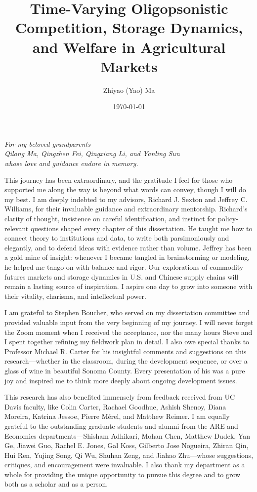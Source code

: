 \documentclass[12pt,authoryear, notitlepage]{elegantpaper}
\title{Time-Varying Oligopsonistic Competition, Storage Dynamics, and Welfare in Agricultural Markets}
\author{Zhiyao (Yao) Ma}
\institute{Committee: Richard J. Sexton, Jeffrey C. Williams, and Stephen Boucher}
\date{\today}
\begin{document}
\maketitle
\thispagestyle{empty}


\begin{dedication}
\textit{For my beloved grandparents}\\
\textit{Qilong Ma, Qingzhen Fei, Qingxiang Li, and Yanling Sun}\\
\textit{whose love and guidance endure in memory.}
\end{dedication}


\newpage
{}


\begin{acknowledgments}
This journey has been extraordinary, and the gratitude I feel for those who supported me along the way is beyond what words can convey, though I will do my best. I am deeply indebted to my advisors, Richard J. Sexton and Jeffrey C. Williams, for their invaluable guidance and extraordinary mentorship. Richard's clarity of thought, insistence on careful identification, and instinct for policy-relevant questions shaped every chapter of this dissertation. He taught me how to connect theory to institutions and data, to write both parsimoniously and elegantly, and to defend ideas with evidence rather than volume. Jeffrey has been a gold mine of insight: whenever I became tangled in brainstorming or modeling, he helped me tango on with balance and rigor. Our explorations of commodity futures markets and storage dynamics in U.S. and Chinese supply chains will remain a lasting source of inspiration. I aspire one day to grow into someone with their vitality, charisma, and intellectual power.

I am grateful to Stephen Boucher, who served on my dissertation committee and provided valuable input from the very beginning of my journey. I will never forget the Zoom moment when I received the acceptance, nor the many hours Steve and I spent together refining my fieldwork plan in detail. I also owe special thanks to Professor Michael R. Carter for his insightful comments and suggestions on this research---whether in the classroom, during the development sequence, or over a glass of wine in beautiful Sonoma County. Every presentation of his was a pure joy and inspired me to think more deeply about ongoing development issues.

This research has also benefited immensely from feedback received from UC Davis faculty, like Colin Carter, Rachael Goodhue, Ashish Shenoy, Diana Moreira, Katrina Jessoe, Pierre M\'erel, and Matthew Reimer. I am equally grateful to the outstanding graduate students and alumni from the ARE and Economics departments---Shisham Adhikari, Mohan Chen, Matthew Dudek, Yan Ge, Jiawei Guo, Rachel E. Jones, Gal Koss, Gilberto Jose Nogueira, Zhiran Qin, Hui Ren, Yujing Song, Qi Wu, Shuhan Zeng, and Jiahao Zhu---whose suggestions, critiques, and encouragement were invaluable. I also thank my department as a whole for providing the unique opportunity to pursue this degree and to grow both as a scholar and as a person.


\end{acknowledgments}
\end{document}
